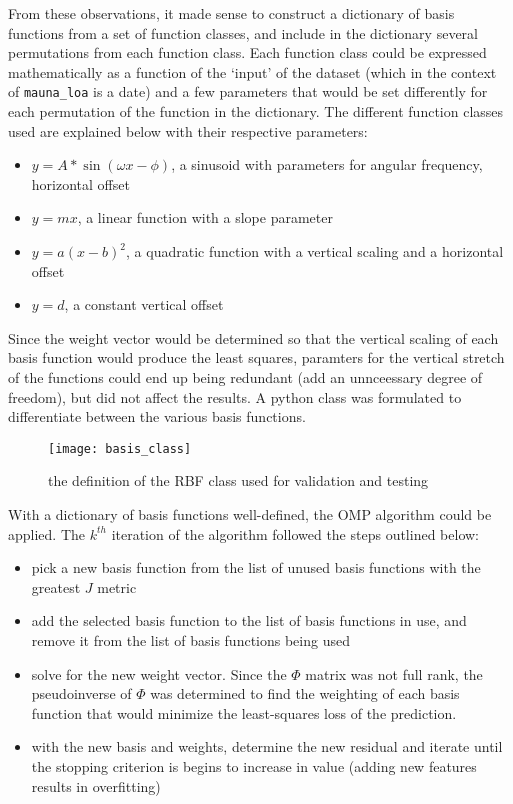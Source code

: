 \documentclass{article}
\begin{document}
From these observations, it made sense to construct a dictionary of basis functions from a set of function classes, and include in the dictionary several permutations from each function class. Each function class could be expressed mathematically as a function of the `input' of the dataset (which in the context of \verb+mauna_loa+ is a date) and a few parameters that would be set differently for each permutation of the function in the dictionary. The different function classes used are explained below with their respective parameters:

\begin{itemize}
\item $y=A * \sin(\omega x - \phi)$, a sinusoid with parameters for angular frequency, horizontal offset
\item $ y=mx$, a linear function with a slope parameter
\item $ y=a (x - b)^2$, a quadratic function with a vertical scaling and a horizontal offset
\item $ y=d$, a constant vertical offset
\end{itemize}

Since the weight vector would be determined so that the vertical scaling of each basis function would produce the least squares, paramters for the vertical stretch of the functions could end up being redundant (add an unnceessary degree of freedom), but did not affect the results. A python class was formulated to differentiate between the various basis functions.

\begin{figure}[H]
\centering
\texttt{[image: basis\_class]}
\caption{the definition of the RBF class used for validation and testing}
\end{figure}

With a dictionary of basis functions well-defined, the OMP algorithm could be applied. The $k^{th}$ iteration of the algorithm followed the steps outlined below:

\begin{itemize}
\item pick a new basis function from the list of unused basis functions with the greatest $J$ metric
\item add the selected basis function to the list of basis functions in use, and remove it from the list of basis functions being used
\item solve for the new weight vector. Since the $\Phi$ matrix was not full rank, the pseudoinverse of $\Phi$ was determined to find the weighting of each basis function that would minimize the least-squares loss of the prediction.
\item with the new basis and weights, determine the new residual and iterate until the stopping criterion is begins to increase in value (adding new features results in overfitting)
\end{itemize}
\end{document}
